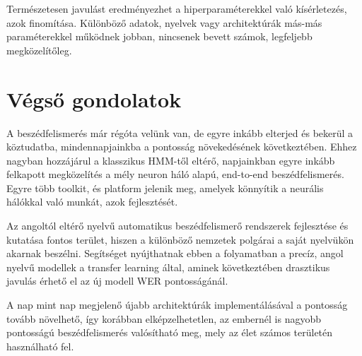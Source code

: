 Természetesen javulást eredményezhet a hiperparaméterekkel való kísérletezés, azok finomítása. Különböző adatok, nyelvek vagy architektúrák más-más paraméterekkel működnek jobban, nincsenek bevett számok, legfeljebb megközelítőleg.

\section{Végső gondolatok}

A beszédfelismerés már régóta velünk van, de egyre inkább elterjed és bekerül a köztudatba, mindennapjainkba a pontosság növekedésének következtében. Ehhez nagyban hozzájárul a klasszikus HMM-től eltérő, napjainkban egyre inkább felkapott megközelítés a mély neuron háló alapú, end-to-end beszédfelismerés. Egyre több toolkit, és platform jelenik meg, amelyek könnyítik a neurális hálókkal való munkát, azok fejlesztését.

Az angoltól eltérő nyelvű automatikus beszédfelismerő rendszerek fejlesztése és kutatása fontos terület, hiszen a különböző nemzetek polgárai a saját nyelvükön akarnak beszélni. Segítséget nyújthatnak ebben a folyamatban a precíz, angol nyelvű modellek a transfer learning által, aminek következtében drasztikus javulás érhető el az új modell WER pontosságánál.

A nap mint nap megjelenő újabb architektúrák implementálásával a pontosság tovább növelhető, így korábban elképzelhetetlen, az embernél is nagyobb pontosságú beszédfelismerés valósítható meg, mely az élet számos területén használható fel.